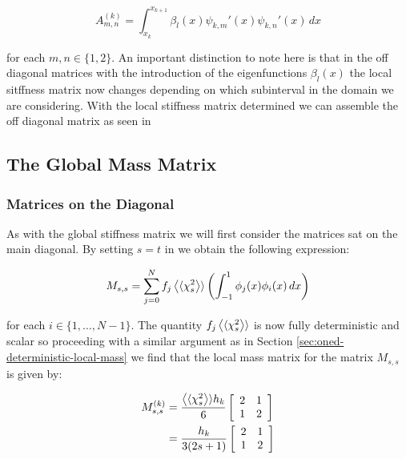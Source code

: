 \begin{equation}
    A^{(k)}_{m,n} = \int_{x_k}^{x_{k+1}}
        \beta_l(x)\psi_{k,m}'(x)\psi_{k,n}'(x)\, dx
\end{equation}

for each $m, n \in \{1, 2\}$. An important distinction to note here is that in
the off diagonal matrices with the introduction of the eigenfunctions
$\beta_l(x)$ the local sitffness matrix now changes depending on which
subinterval in the domain we are considering. With the local stiffness matrix
determined we can assemble the off diagonal matrix as seen in

\subsection{The Global Mass Matrix}

\subsubsection{Matrices on the Diagonal}

As with the global stiffness matrix we will first consider the matrices sat on
the main diagonal. By setting $s = t$ in  we
obtain the following expression:

\begin{equation}
    M_{s,s} = \sum_{j=0}^Nf_j\left\langle\langle\chi_s^2\right\rangle\rangle\left(
        \int_{-1}^1\phi_j(x)\phi_i(x)\, dx\right)
\end{equation}

for each $i \in \{1,\ldots,N-1\}$. The quantity $f_j\left\langle\langle\chi_s^2\right\rangle\rangle$ is now
fully deterministic and scalar so proceeding with a similar argument as in
Section \ref{sec:oned-deterministic-local-mass} we find that the local mass
matrix for the matrix $M_{s,s}$ is given by:

\begin{align}
  \begin{split}
    M_{s,s}^{(k)} &= \frac{\left\langle\langle\chi_s^2\right\rangle\rangle h_k}{6}\left[\begin{array}{c c}
                        2 & 1 \\ 1 & 2
                    \end{array}\right]\\
                  &= \frac{h_k}{3(2s + 1)}\left[\begin{array}{c c}
                        2 & 1 \\ 1 & 2
                    \end{array}\right]
  \end{split}
\end{align}

